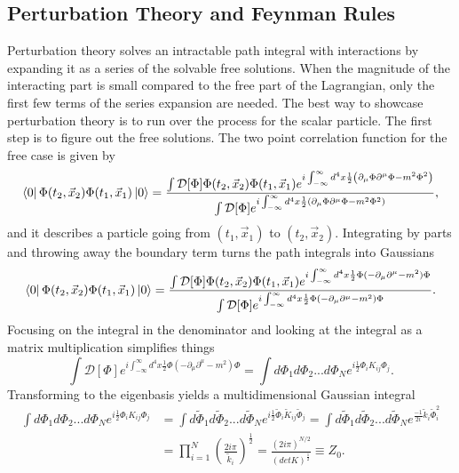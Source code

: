 \subsection{Perturbation Theory and Feynman Rules}
Perturbation theory solves an intractable path integral with interactions by expanding it as a series of the solvable free solutions. When the magnitude of the interacting part is small compared to the free part of the Lagrangian, only the first few terms of the series expansion are needed. The best way to showcase perturbation theory is to run over the process for the scalar particle. The first step is to figure out the free solutions. The two point correlation function for the free case is given by
\begin{equation}
\bra{0}\Phi(t_2,\vec{x}_2)\Phi(t_1,\vec{x}_1)\ket{0} = 
\frac{\int \mathcal{D}[\Phi]\Phi(t_2,\vec{x}_2)\Phi(t_1,\vec{x}_1)e^{i\int_{-\infty}^{\infty} d^4x \frac{1}{2}\left(\partial_\mu\Phi\partial^\mu\Phi - m^2 \Phi^2 \right)}}
{\int \mathcal{D}[\Phi]e^{i\int_{-\infty}^{\infty} d^4x \frac{1}{2}\left(\partial_\mu\Phi\partial^\mu\Phi - m^2 \Phi^2 \right)}},
\end{equation}
and it describes a particle going from $(t_1,\vec{x}_1)$ to $(t_2,\vec{x}_2)$. Integrating by parts and throwing away the boundary term turns the path integrals into Gaussians 
\begin{equation}
\label{eq:phi2pt}
\bra{0}\Phi(t_2,\vec{x}_2)\Phi(t_1,\vec{x}_1)\ket{0} = 
\frac{\int \mathcal{D}[\Phi]\Phi(t_2,\vec{x}_2)\Phi(t_1,\vec{x}_1)e^{i\int_{-\infty}^{\infty} d^4x \frac{1}{2}\Phi (-\partial_\mu\partial^\mu - m^2)\Phi}}
{\int \mathcal{D}[\Phi]e^{i\int_{-\infty}^{\infty} d^4x \frac{1}{2}\Phi (-\partial_\mu\partial^\mu - m^2)\Phi}}.
\end{equation}
Focusing on the integral in the denominator and looking at the integral as a matrix multiplication simplifies things 
\begin{equation}
\int \mathcal{D}[\Phi]e^{i\int_{-\infty}^{\infty} d^4x \frac{1}{2}\Phi (-\partial_\mu\partial^\mu - m^2)\Phi}
= \int d\Phi_1 d\Phi_2 ... d\Phi_N e^{i\frac{1}{2}\Phi_{i} K_{ij} \Phi_{j}}.
\end{equation}
Transforming to the eigenbasis yields a multidimensional Gaussian integral
\begin{equation}
\begin{split}
 \int d\Phi_1 d\Phi_2 ... d\Phi_N e^{i\frac{1}{2}\Phi_{i} K_{ij} \Phi_{j}} 
 &= \int d\tilde{\Phi}_1 d\tilde{\Phi}_2 ... d\tilde{\Phi}_N e^{i\frac{1}{2}\tilde{\Phi}_{i} \tilde{K}_{ij} \tilde{\Phi}_{j}} 
 = \int d\tilde{\Phi}_1 d\tilde{\Phi}_2 ... d\tilde{\Phi}_N e^{\frac{-1}{2i} \tilde{k}_i \tilde{\Phi}_{i}^2} \\ 
& = \prod_{i=1}^N \left( \frac{2i\pi}{\tilde{k}_i} \right)^\frac{1}{2} = \frac{\left( 2i\pi \right)^{N/2}}{ \left( detK \right)^\frac{1}{2}} \equiv Z_0.
\end{split}
\end{equation}

